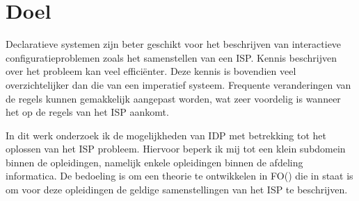 \section{Doel}
Declaratieve systemen zijn beter geschikt voor het beschrijven van interactieve configuratieproblemen zoals het samenstellen van een ISP. Kennis beschrijven over het probleem kan veel effici\"{e}nter. Deze kennis is bovendien veel overzichtelijker dan die van een imperatief systeem. Frequente veranderingen van de regels kunnen gemakkelijk aangepast worden, wat zeer voordelig is wanneer het op de regels van het ISP aankomt. 

In dit werk onderzoek ik de mogelijkheden van IDP met betrekking tot het oplossen van het ISP probleem. Hiervoor beperk ik mij tot een klein subdomein binnen de opleidingen, namelijk enkele opleidingen binnen de afdeling informatica. De bedoeling is om een theorie te ontwikkelen in FO(\textperiodcentered) die in staat is om voor deze opleidingen de geldige samenstellingen van het ISP te beschrijven. 


